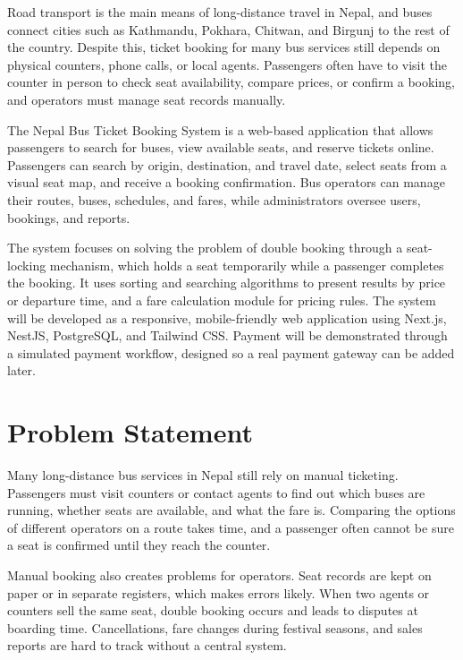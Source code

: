 \documentclass[12pt,a4paper,openany,oneside]{report}
\begin{document}
	Road transport is the main means of long-distance travel in Nepal, and buses connect cities such as Kathmandu, Pokhara, Chitwan, and Birgunj to the rest of the country. Despite this, ticket booking for many bus services still depends on physical counters, phone calls, or local agents. Passengers often have to visit the counter in person to check seat availability, compare prices, or confirm a booking, and operators must manage seat records manually.
	
	The Nepal Bus Ticket Booking System is a web-based application that allows passengers to search for buses, view available seats, and reserve tickets online. Passengers can search by origin, destination, and travel date, select seats from a visual seat map, and receive a booking confirmation. Bus operators can manage their routes, buses, schedules, and fares, while administrators oversee users, bookings, and reports.
	
	The system focuses on solving the problem of double booking through a seat-locking mechanism, which holds a seat temporarily while a passenger completes the booking. It uses sorting and searching algorithms to present results by price or departure time, and a fare calculation module for pricing rules. The system will be developed as a responsive, mobile-friendly web application using Next.js, NestJS, PostgreSQL, and Tailwind CSS. Payment will be demonstrated through a simulated payment workflow, designed so a real payment gateway can be added later.
	
	\section{Problem Statement}
	
	Many long-distance bus services in Nepal still rely on manual ticketing. Passengers must visit counters or contact agents to find out which buses are running, whether seats are available, and what the fare is. Comparing the options of different operators on a route takes time, and a passenger often cannot be sure a seat is confirmed until they reach the counter.
	
	Manual booking also creates problems for operators. Seat records are kept on paper or in separate registers, which makes errors likely. When two agents or counters sell the same seat, double booking occurs and leads to disputes at boarding time. Cancellations, fare changes during festival seasons, and sales reports are hard to track without a central system.
	
\end{document}
